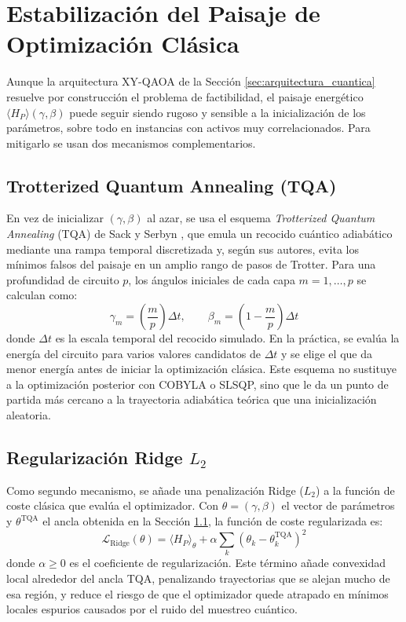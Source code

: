 \section{Estabilización del Paisaje de Optimización Clásica}
\label{sec:estabilizacion_optimizacion}

Aunque la arquitectura XY-QAOA de la Sección \ref{sec:arquitectura_cuantica} resuelve por construcción el problema de factibilidad, el paisaje energético $\langle H_P \rangle(\gamma, \beta)$ puede seguir siendo rugoso y sensible a la inicialización de los parámetros, sobre todo en instancias con activos muy correlacionados. Para mitigarlo se usan dos mecanismos complementarios.

\subsection{Trotterized Quantum Annealing (TQA)}
\label{subsec:tqa}

En vez de inicializar $(\gamma, \beta)$ al azar, se usa el esquema \textit{Trotterized Quantum Annealing} (TQA) de Sack y Serbyn \cite{SackSerbyn2021}, que emula un recocido cuántico adiabático mediante una rampa temporal discretizada y, según sus autores, evita los mínimos falsos del paisaje en un amplio rango de pasos de Trotter. Para una profundidad de circuito $p$, los ángulos iniciales de cada capa $m = 1, \dots, p$ se calculan como:
\begin{equation}
    \gamma_m = \left(\frac{m}{p}\right) \Delta t, \qquad
    \beta_m = \left(1 - \frac{m}{p}\right) \Delta t
    \label{eq:tqa_schedule}
\end{equation}
donde $\Delta t$ es la escala temporal del recocido simulado. En la práctica, se evalúa la energía del circuito para varios valores candidatos de $\Delta t$ y se elige el que da menor energía antes de iniciar la optimización clásica. Este esquema no sustituye a la optimización posterior con COBYLA o SLSQP, sino que le da un punto de partida más cercano a la trayectoria adiabática teórica que una inicialización aleatoria.

\subsection{Regularización Ridge $L_2$}
\label{subsec:ridge_l2}

Como segundo mecanismo, se añade una penalización Ridge ($L_2$) a la función de coste clásica que evalúa el optimizador. Con $\theta = (\gamma, \beta)$ el vector de parámetros y $\theta^{\text{TQA}}$ el ancla obtenida en la Sección \ref{subsec:tqa}, la función de coste regularizada es:
\begin{equation}
    \mathcal{L}_{\text{Ridge}}(\theta) = \langle H_P \rangle_\theta +
    \alpha \sum_{k} \left( \theta_k - \theta_k^{\text{TQA}} \right)^2
    \label{eq:ridge_regularizacion}
\end{equation}
donde $\alpha \geq 0$ es el coeficiente de regularización. Este término añade convexidad local alrededor del ancla TQA, penalizando trayectorias que se alejan mucho de esa región, y reduce el riesgo de que el optimizador quede atrapado en mínimos locales espurios causados por el ruido del muestreo cuántico.

